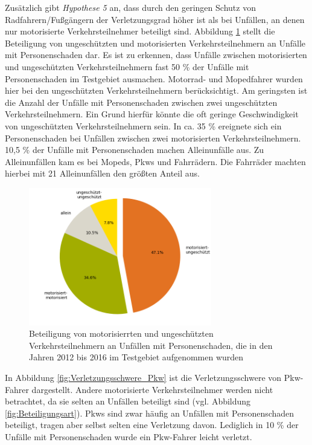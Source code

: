 Zusätzlich gibt \textit{Hypothese 5} an, dass durch den geringen Schutz von Radfahrern/Fußgängern der Verletzungsgrad höher ist als bei Unfällen, an denen nur motorisierte Verkehrsteilnehmer beteiligt sind. Abbildung \ref{fig:Verkehrsbeteiligung_Personenschaden} stellt die Beteiligung von ungeschützten und motorisierten Verkehrsteilnehmern an Unfälle mit Personenschaden dar. Es ist zu erkennen, dass Unfälle zwischen motorisierten und ungeschützten Verkehrsteilnehmern fast 50 \% der Unfälle mit Personenschaden im Testgebiet ausmachen. Motorrad- und Mopedfahrer wurden hier bei den ungeschützten Verkehrsteilnehmern berücksichtigt. Am geringsten ist die Anzahl der Unfälle mit Personenschaden zwischen zwei ungeschützten Verkehrsteilnehmern. Ein Grund hierfür könnte die oft geringe Geschwindigkeit von ungeschützten Verkehrsteilnehmern sein. In ca. 35 \% ereignete sich ein Personenschaden bei Unfällen zwischen zwei motorisierten Verkehrsteilnehmern. 10,5 \% der Unfälle mit Personenschaden machen Alleinunfälle aus. Zu Alleinunfällen kam es bei Mopeds, Pkws und Fahrrädern. Die Fahrräder machten hierbei mit 21 Alleinunfällen den größten Anteil aus.

\begin{savenotes}
	\begin{figure}[H]
		\centering
		\includegraphics[width=8cm,height=6cm]{figures/motorisiert_ungeschuetzt}
		\caption[Beteiligung von motorisierrten und ungeschützten Verkehrsteilnehmern an Unfällen mit Personenschaden, die in den Jahren 2012 bis 2016 im Testgebiet aufgenommen wurden]{Beteiligung von motorisierrten und ungeschützten Verkehrsteilnehmern an Unfällen mit Personenschaden, die in den Jahren 2012 bis 2016 im Testgebiet aufgenommen wurden}\label{fig:Verkehrsbeteiligung_Personenschaden}
	\end{figure}
\end{savenotes}

In Abbildung \ref{fig:Verletzungsschwere_Pkw} ist die Verletzungsschwere von Pkw-Fahrer dargestellt. Andere motorisierte Verkehrsteilnehmer werden nicht betrachtet, da sie selten an Unfällen beteiligt sind (vgl. Abbildung \ref{fig:Beteiligungsart}). Pkws sind zwar häufig an Unfällen mit Personenschaden beteiligt, tragen aber selbst selten eine Verletzung davon. Lediglich in 10 \% der Unfälle mit Personenschaden wurde ein Pkw-Fahrer leicht verletzt.

